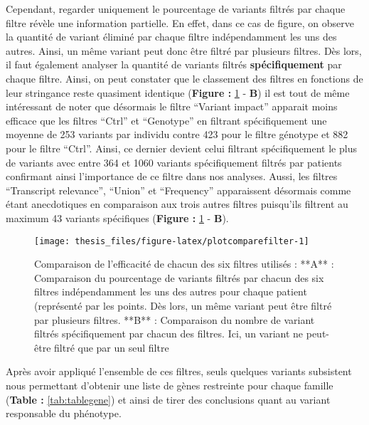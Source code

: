 \documentclass[12pt,twoside]{reedthesis}
\theoremstyle{definition}
\theoremstyle{definition}
\theoremstyle{remark}
\begin{document}
  Cependant, regarder uniquement le pourcentage de variants filtrés par
  chaque filtre révèle une information partielle. En effet, dans ce cas de
  figure, on observe la quantité de variant éliminé par chaque filtre
  indépendamment les uns des autres. Ainsi, un même variant peut donc être
  filtré par plusieurs filtres. Dès lors, il faut également analyser la
  quantité de variants filtrés \textbf{spécifiquement} par chaque filtre.
  Ainsi, on peut constater que le classement des filtres en fonctions de
  leur stringance reste quasiment identique (\textbf{Figure :}
  \ref{fig:plotcomparefilter} - \textbf{B}) il est tout de même
  intéressant de noter que désormais le filtre ``Variant impact'' apparait
  moins efficace que les filtres ``Ctrl'' et ``Genotype'' en filtrant
  spécifiquement une moyenne de 253 variants par individu contre 423 pour
  le filtre génotype et 882 pour le filtre ``Ctrl''. Ainsi, ce dernier
  devient celui filtrant spécifiquement le plus de variants avec entre 364
  et 1060 variants spécifiquement filtrés par patients confirmant ainsi
  l'importance de ce filtre dans nos analyses. Aussi, les filtres
  ``Transcript relevance'', ``Union'' et ``Frequency'' apparaissent
  désormais comme étant anecdotiques en comparaison aux trois autres
  filtres puisqu'ils filtrent au maximum 43 variants spécifiques
  (\textbf{Figure :} \ref{fig:plotcomparefilter} - \textbf{B}).
  
  \newpage
  
  \begin{figure}
  
  {\centering \texttt{[image: thesis\_files/figure-latex/plotcomparefilter-1]} 
  
  }
  
  \caption[Comparaison de l'efficacité de chacun des six filtres utilisés]{Comparaison de l'efficacité de chacun des six filtres utilisés : **A** : Comparaison du pourcentage de variants filtrés par chacun des six filtres indépendamment les uns des autres pour chaque patient (représenté par les points. Dès lors, un même variant peut être filtré par plusieurs filtres. **B** : Comparaison du nombre de variant filtrés spécifiquement par chacun des filtres. Ici, un variant ne peut-être filtré que par un seul filtre}\label{fig:plotcomparefilter}
  \end{figure}
  
  \newpage
  
  Après avoir appliqué l'ensemble de ces filtres, seuls quelques variants
  subsistent nous permettant d'obtenir une liste de gènes restreinte pour
  chaque famille (\textbf{Table : }\ref{tab:tablegene}) et ainsi de tirer
  des conclusions quant au variant responsable du phénotype.
  
\end{document}
